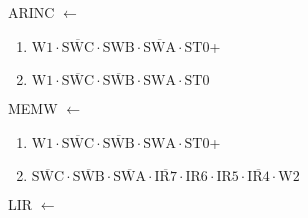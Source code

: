 \documentclass[UTF8]{ctexart}
\begin{document}
\noindent ARINC $\leftarrow$
\begin{enumerate}[\indent\indent]
	\item $\text{W1} \cdot \overline{\text{SWC}} \cdot \text{SWB} \cdot \overline{\text{SWA}} \cdot \text{ST0}$+
	\item $\text{W1} \cdot \overline{\text{SWC}} \cdot \overline{\text{SWB}} \cdot \text{SWA} \cdot \text{ST0}$
\end{enumerate}
\noindent MEMW $\leftarrow$
\begin{enumerate}[\indent\indent]
	\item $\text{W1} \cdot \overline{\text{SWC}} \cdot \overline{\text{SWB}} \cdot \text{SWA} \cdot \text{ST0}$+
	\item $\overline{\text{SWC}} \cdot\overline{\text{SWB}}\cdot \overline{\text{SWA}} \cdot \overline{\text{IR7}} \cdot \text{IR6} \cdot \text{IR5} \cdot \overline{\text{IR4}} \cdot \text{W2}$
\end{enumerate}
\noindent LIR $\leftarrow$
\end{document}
